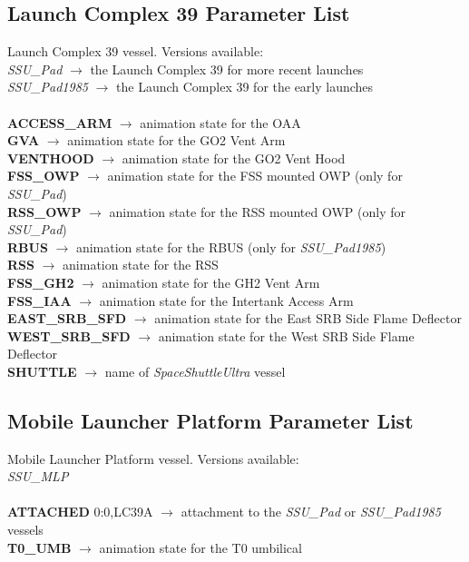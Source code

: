 \documentclass[Space_Shuttle_Ultra_Manual.tex]{subfiles}
\begin{document}
\begin{multicols*}{2}
\subsection{Launch Complex 39 Parameter List}
\noindent
Launch Complex 39 vessel. Versions available:
\\
\textit{SSU\_Pad} $\rightarrow$ the Launch Complex 39 for more recent launches
\\
\textit{SSU\_Pad1985} $\rightarrow$ the Launch Complex 39 for the early launches
\\
\\
\textbf{ACCESS\_ARM} $\rightarrow$ animation state for the OAA
\\
\textbf{GVA} $\rightarrow$ animation state for the GO2 Vent Arm
\\
\textbf{VENTHOOD} $\rightarrow$ animation state for the GO2 Vent Hood
\\
\textbf{FSS\_OWP} $\rightarrow$ animation state for the FSS mounted OWP (only for \textit{SSU\_Pad})
\\
\textbf{RSS\_OWP} $\rightarrow$ animation state for the RSS mounted OWP (only for \textit{SSU\_Pad})
\\
\textbf{RBUS} $\rightarrow$ animation state for the RBUS (only for \textit{SSU\_Pad1985})
\\
\textbf{RSS} $\rightarrow$ animation state for the RSS
\\
\textbf{FSS\_GH2} $\rightarrow$ animation state for the GH2 Vent Arm
\\
\textbf{FSS\_IAA} $\rightarrow$ animation state for the Intertank Access Arm
\\
\textbf{EAST\_SRB\_SFD} $\rightarrow$ animation state for the East SRB Side Flame Deflector
\\
\textbf{WEST\_SRB\_SFD} $\rightarrow$ animation state for the West SRB Side Flame Deflector
\\
\textbf{SHUTTLE} $\rightarrow$ name of \textit{SpaceShuttleUltra} vessel
\\

\subsection{Mobile Launcher Platform Parameter List}
\noindent
Mobile Launcher Platform vessel. Versions available:
\\
\textit{SSU\_MLP}
\\
\\
\textbf{ATTACHED} 0:0,LC39A $\rightarrow$ attachment to the \textit{SSU\_Pad} or \textit{SSU\_Pad1985} vessels
\\
\textbf{T0\_UMB} $\rightarrow$ animation state for the T0 umbilical
\\


\end{multicols*}
\end{document}

